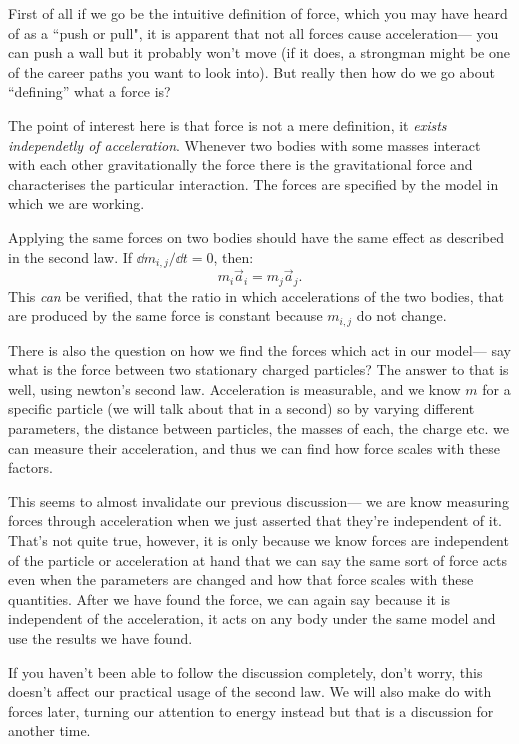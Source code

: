 First of all if we go be the intuitive definition of force, which you may have heard of as a ``push or pull",
it is apparent that not all forces cause acceleration--- you can push a wall but it probably won't move (if it 
does, a strongman might be one of the career paths you want to look into). But really then how do we go about 
``defining'' what a force is?

The point of interest here is that force is not a mere definition, it \emph{exists independetly of acceleration}.
Whenever two bodies with some masses interact with each other gravitationally the force there is the gravitational 
force and characterises the particular interaction. The forces are specified by the model in which we are working.

Applying the same forces on two bodies should have the same 
effect as described in the second law. If $\dd{m}_{i,j}/\dd{t} = 0$, then:
\[
m_i\vec{a}_i = m_j\vec{a}_j.
\]
This \emph{can} be verified, that the ratio in which accelerations of the two bodies, that are produced by the same force is constant 
because $m_{i,j}$ do not change. 

There is also the question on how we find the forces which act in our model--- say what is the force between 
two stationary charged particles? The answer to that is well, using newton's second law. Acceleration is measurable,
and we know $m$ for a specific particle (we will talk about that in a second) so by varying different parameters,
the distance between particles, the masses of each, the charge etc. we can measure their acceleration, and thus 
we can find how force scales with these factors. 

This seems to almost invalidate our previous discussion--- we are know measuring forces through acceleration when 
we just asserted that they're independent of it. That's not quite true, however, it is only because we know 
forces are independent of the particle or acceleration at hand that we can say the same sort of force acts even when 
the parameters are changed and how that force scales with these quantities. 
After we have found the force, we can 
again say because it is independent of the acceleration, it acts on any body under the same model and use the results 
we have found.

If you haven't been able to follow the discussion completely, don't worry, this doesn't affect our practical usage 
of the second law. We will also make do with forces later, turning our attention to energy instead but that is a discussion 
for another time.

